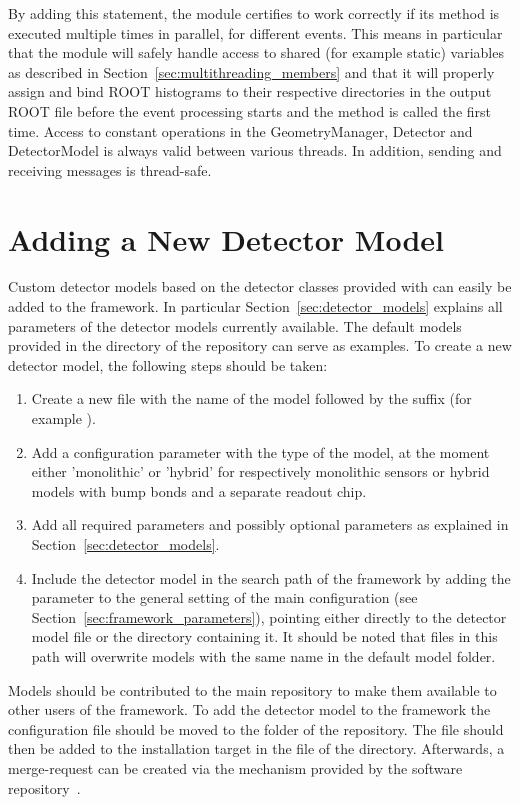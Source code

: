 By adding this statement, the module certifies to work correctly if its  method is executed multiple times in parallel, for different events.
This means in particular that the module will safely handle access to shared (for example static) variables as described in Section~\ref{sec:multithreading_members} and that it will properly assign and bind ROOT histograms to their respective directories in the output ROOT file before the event processing starts and the  method is called the first time.
Access to constant operations in the GeometryManager, Detector and DetectorModel is always valid between various threads. In addition, sending and receiving messages is thread-safe.


\section{Adding a New Detector Model}
\label{sec:adding_detector_model}
Custom detector models based on the detector classes provided with \apsq can easily be added to the framework.
In particular Section~\ref{sec:detector_models} explains all parameters of the detector models currently available.
The default models provided in the  directory of the repository can serve as examples.
To create a new detector model, the following steps should be taken:
\begin{enumerate}
\item Create a new file with the name of the model followed by the  suffix (for example ).
\item Add a configuration parameter  with the type of the model, at the moment either 'monolithic' or 'hybrid' for respectively monolithic sensors or hybrid models with bump bonds and a separate readout chip.
\item Add all required parameters and possibly optional parameters as explained in Section~\ref{sec:detector_models}.
\item Include the detector model in the search path of the framework by adding the  parameter to the general setting of the main configuration (see Section~\ref{sec:framework_parameters}), pointing either directly to the detector model file or the directory containing it. It should be noted that files in this path will overwrite models with the same name in the default model folder.
\end{enumerate}

Models should be contributed to the main repository to make them available to other users of the framework.
To add the detector model to the framework the configuration file should be moved to the  folder of the repository.
The file should then be added to the installation target in the  file of the  directory.
Afterwards, a merge-request can be created via the mechanism provided by the software repository~\cite{ap2-repo}.
